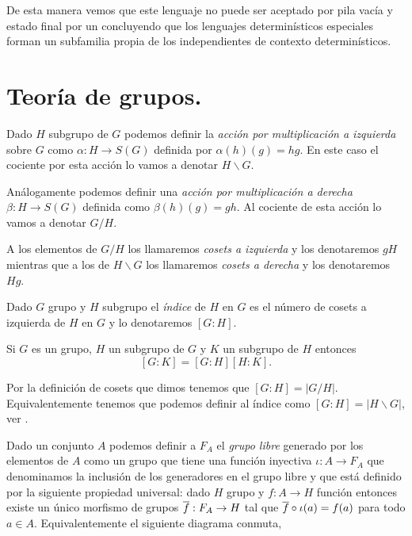 \documentclass[tesis.tex]{subfiles}
\begin{document}
\begin{ej}
	De esta manera vemos que este lenguaje no puede ser aceptado por pila vacía y estado final por un \APD concluyendo que los lenguajes determinísticos especiales forman un subfamilia propia de los independientes de contexto determinísticos.
\end{ej}


\section{Teoría de grupos.}\label{secc_teo_grp}



\begin{deff}
	Dado $H$ subgrupo de $G$ podemos definir la \emph{acción por multiplicación a izquierda} sobre $G$ como $\alpha: H \to S(G)$ definida por $\alpha(h)(g) = hg$.
	En este caso el cociente por esta acción lo vamos a denotar $H \backslash G $.
	
	Análogamente podemos definir una \emph{acción por multiplicación a derecha} $\beta:H \to S(G)$ definida como $\beta(h)(g) = gh$.
	Al cociente de esta acción lo vamos a denotar $G/H$.
\end{deff}

A los elementos de $G/H$ los llamaremos \emph{cosets a izquierda} y los denotaremos $gH$ mientras que a los de $H \backslash G$ los llamaremos \emph{cosets a derecha} y los denotaremos $Hg$.

\begin{deff}
	Dado $G$ grupo y $H$ subgrupo el \emph{índice} de $H$ en $G$ es el número de cosets a izquierda de $H$ en $G$ y lo denotaremos $[G:H]$.
\end{deff}


\begin{lema}\label{lema_ind_prod_inter}
	Si $G$ es un grupo, $H$ un subgrupo de $G$ y $K$ un subgrupo de $H$ entonces
	\[
	[G:K] = [G:H][H:K].
	\]
\end{lema}

Por la definición de cosets que dimos tenemos que $[G:H] = |G/H|$.
Equivalentemente tenemos que podemos definir al índice como $[G:H] = |H \backslash G|$, ver \cite{}.

\begin{deff}
	Dado un conjunto $A$ podemos definir a $F_{A}$ el \emph{grupo libre} generado por los elementos de $A$ como un grupo que tiene una función inyectiva $\iota: A \to F_{A}$ que denominamos la inclusión de los generadores en el grupo libre y que está definido por la siguiente propiedad universal: 
	dado $H$ grupo y $f:A \to H$ función entonces existe un único morfismo de grupos $\overline f: F_{A} \to H$ tal que $\overline f \circ \iota (a) = f(a)$ para todo $a \in A$.
	Equivalentemente el siguiente diagrama conmuta,
	\begin{center}
	\end{center}
	
\end{deff}
\end{document}
